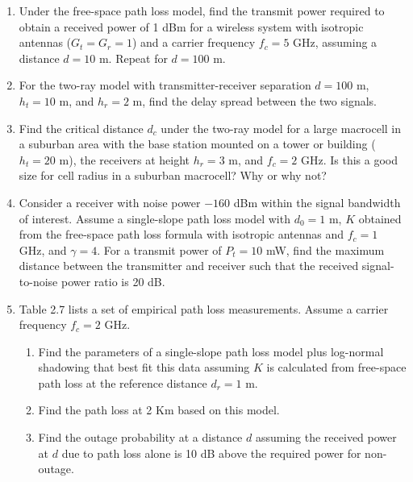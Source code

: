 \documentclass[a4paper,12pt]{book}
\begin{document}
	\begin{enumerate}
		\item Under the free-space path loss model, find the transmit power required to obtain a received power of 1 dBm for a wireless system with isotropic antennas ($G_t = G_r = 1$) and a carrier frequency $f_c = 5$ GHz, assuming a distance $d = 10$ m. Repeat for $d = 100$ m.
		
		\item For the two-ray model with transmitter-receiver separation $d = 100$ m, $h_t = 10$ m, and $h_r = 2$ m, find the delay spread between the two signals.
		
		\item Find the critical distance $d_c$ under the two-ray model for a large macrocell in a suburban area with the base station mounted on a tower or building ($h_t = 20$ m), the receivers at height $h_r = 3$ m, and $f_c = 2$ GHz. Is this a good size for cell radius in a suburban macrocell? Why or why not?
		
		\item Consider a receiver with noise power $-160$ dBm within the signal bandwidth of interest. Assume a single-slope path loss model with $d_0 = 1$ m, $K$ obtained from the free-space path loss formula with isotropic antennas and $f_c = 1$ GHz, and $\gamma = 4$. For a transmit power of $P_t = 10$ mW, find the maximum distance between the transmitter and receiver such that the received signal-to-noise power ratio is 20 dB.
		
		\item Table 2.7 lists a set of empirical path loss measurements. Assume a carrier frequency $f_c = 2$ GHz.
		
		\begin{enumerate}
			\item Find the parameters of a single-slope path loss model plus log-normal shadowing that best fit this data assuming $K$ is calculated from free-space path loss at the reference distance $d_r = 1$ m.
			
			\item Find the path loss at 2 Km based on this model.
			
			\item Find the outage probability at a distance $d$ assuming the received power at $d$ due to path loss alone is 10 dB above the required power for non-outage.
		\end{enumerate}
	\end{enumerate}
	
\end{document}
